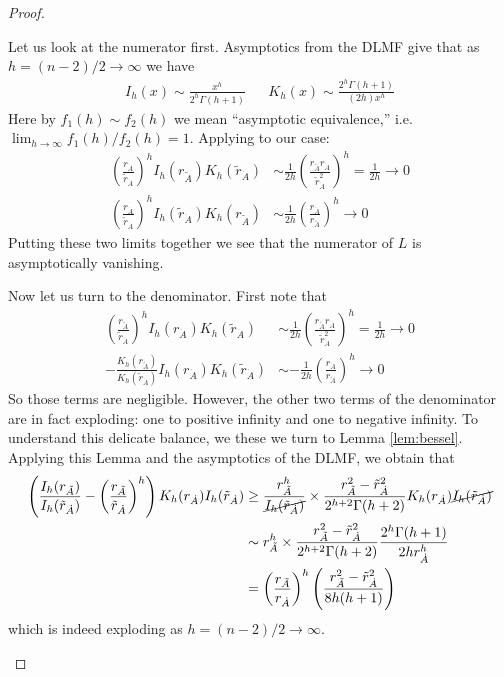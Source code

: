 \documentclass[nofootinbib,english, aip, jcp, priprint, graphicx,floatfix]{revtex4-1}
\theoremstyle{plain}
\theoremstyle{definition}
\theoremstyle{plain}
\begin{document}
\begin{proof}
\begin{itemize}
    Let us look at the numerator first.  Asymptotics from the DLMF give that as $h=(n-2)/2 \rightarrow \infty$ we have
    \begin{align*}
    I_h(x) \sim \frac{x^h}{2^h\Gamma(h+1)} & & K_h(x) \sim \frac{2^h\Gamma(h+1)}{(2h)x^h}  
    \end{align*}
    Here by $f_1(h)\sim f_2(h)$ we mean ``asymptotic equivalence,'' i.e.\ $\lim_{h\rightarrow\infty}f_1(h)/f_2(h)=1$. Applying to our case:
    \begin{align*}
        \left(\frac{r_{\dot A}}{\tilde r_{\dot A}}\right)^h I_h (r_{\tilde{A}}) K_h ( \tilde r_{\dot A}) &
	\sim \frac{1}{2h}\left(\frac{r_{\tilde{A}} r_{\dot A}}{\tilde r_{\dot A}^2}\right)^h = \frac{1}{2h} \rightarrow 0 \\
        \left(\frac{r_{\dot A}}{\tilde r_{\dot A}}\right)^h I_h ( \tilde r_{\dot A}) K_h (r_{\tilde{A}}) &
	\sim \frac{1}{2h}\left(\frac{ r_{\dot A}}{r_{\tilde A}}\right)^h \rightarrow 0
    \end{align*}
    Putting these two limits together we see that the numerator of $L$ is asymptotically vanishing.

    Now let us turn to the denominator.  First note that 
    \begin{align*}
     \left( \frac{r_{\tilde{A}}}{\tilde r_{\dot A}}\right)^h  
	    I_h (r_{\dot A})K_h ( \tilde r_{\dot A}) &\sim \frac{1}{2h}\left(\frac{r_{\tilde{A}} r_{\dot A}}{\tilde r_{\dot A}^2}\right)^h = \frac{1}{2h} \rightarrow 0\\
     - \frac{K_h ( r_{\tilde{A}})}{K_h ( \tilde r_{\dot A})} 
	    I_h (r_{\dot A})K_h ( \tilde r_{\dot A}) &\sim -\frac{1}{2h}\left(\frac{r_{\dot A}}{r_{\tilde A}}\right)^h \rightarrow 0
    \end{align*}
    So those terms are negligible.  However, the other two terms of the denominator are in fact exploding: one to positive infinity and one to negative infinity.  To understand this delicate balance, we these we turn to Lemma \ref{lem:bessel}.  Applying this Lemma and the asymptotics of the DLMF, we obtain that
    \begin{align*}
    \left( \frac{I_h ( r_{\tilde{A}})}{I_h ( \tilde r_{\dot A})} - \left(\frac{r_{\tilde{A}}}{\tilde r_{\dot A}} \right)^h  \right)
                K_h ( r_{\dot A}) I_h ( \tilde r_{\dot A}) 
        &\geq \frac{r_{\tilde{A}}^h}{\cancel{I_h(\tilde r_{\dot A})}}\times\frac{r_{\tilde{A}}^{2} -\tilde r_{\dot A}^{2}}{2^{h+2}\Gamma(h+2)} K_h ( r_{\dot A}) \cancel{I_h ( \tilde r_{\dot A})} \\
        &\sim r_{\tilde{A}}^h\times\frac{r_{\tilde{A}}^{2} -\tilde r_{\dot A}^{2}}{2^{h+2}\Gamma(h+2)} \frac{2^h \Gamma(h+1)}{2hr_{\dot A}^h}  \\
        &=\left(\frac{r_{\tilde{A}}}{r_{\dot A}} \right)^h \left(\frac{r_{\tilde A}^2 - \tilde r_{\dot A}^2}{8h(h+1)}\right)
    \end{align*}
    which is indeed exploding as $h=(n-2)/2 \rightarrow \infty$.  


\end{itemize}
\end{proof}
\end{document}
